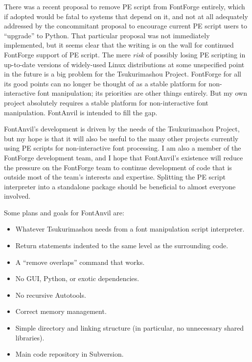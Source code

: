 \documentclass[11pt]{report}
\begin{document}
There was a recent proposal to remove PE script from FontForge entirely,
which if adopted would be fatal to systems that depend on it, and not at all
adequately addressed by the concommitant proposal to encourage current PE
script users to ``upgrade'' to Python.  That particular proposal was not
immediately implemented, but it seems clear that the writing is on the wall
for continued FontForge support of PE script.  The mere \emph{risk} of
possibly losing PE scripting in up-to-date versions of widely-used Linux
distributions at some unspecified point in the future is a big problem for
the Tsukurimashou Project.  FontForge for all its good points can no longer
be thought of as a stable platform for non-interactive font manipulation;
its priorities are other things entirely.  But my own project absolutely
requires a stable platform for non-interactive font manipulation.  FontAnvil
is intended to fill the gap.

FontAnvil's development is driven by the needs of the Tsukurimashou Project,
but my hope is that it will also be useful to the many other projects
currently using PE scripts for non-interactive font processing.  I am also a
member of the FontForge development team, and I hope that FontAnvil's
existence will reduce the pressure on the FontForge team to continue
development of code that is outside most of the team's interests and
expertise.  Splitting the PE script interpreter into a standalone package
should be beneficial to almost everyone involved.

Some plans and goals for FontAnvil are:
\begin{itemize}
\item Whatever Tsukurimashou needs from a font manipulation script
  interpreter.
\item Return statements indented to the same level as the surrounding code.
\item A ``remove overlaps'' command that works.
\item No GUI, Python, or exotic dependencies.
\item No recursive Autotools.
\item Correct memory management.
\item Simple directory and linking structure (in particular, no
  unnecessary shared libraries).
\item Main code repository in Subversion.
\end{itemize}
\end{document}
